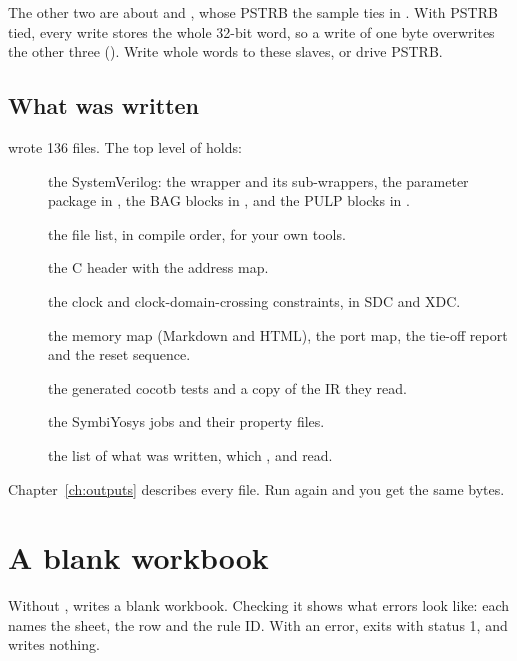 The other two are about  and , whose PSTRB the sample ties in
. With PSTRB tied, every write stores the whole 32-bit word, so a
write of one byte overwrites the other three (). Write whole
words to these slaves, or drive PSTRB.

\subsection{What was written}

 wrote 136 files. The top level of  holds:

\begin{description}
\item[] the SystemVerilog: the wrapper  and its
  sub-wrappers, the parameter package in , the BAG blocks in
  , and the PULP blocks in .
\item[] the file list, in compile order, for your own tools.
\item[] the C header with the address map.
\item[] the clock and clock-domain-crossing constraints, in SDC and XDC.
\item[] the memory map (Markdown and HTML), the port map, the tie-off report
  and the reset sequence.
\item[] the generated cocotb tests and a copy of the IR they read.
\item[] the SymbiYosys jobs and their property files.
\item[] the list of what was written, which ,
   and  read.
\end{description}

Chapter~\ref{ch:outputs} describes every file. Run  again and you get
the same bytes.

\section{A blank workbook}

Without ,  writes a blank workbook. Checking it shows
what errors look like: each names the sheet, the row and the rule ID. With an error,
 exits with status 1, and  writes nothing.


